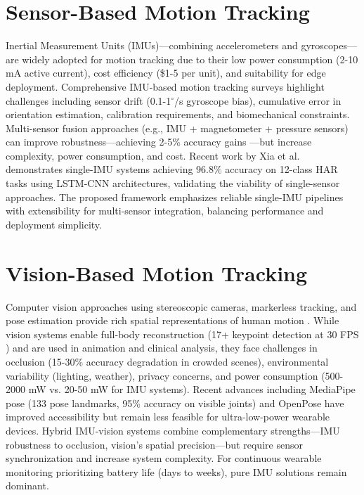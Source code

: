 \section{Sensor-Based Motion Tracking}
Inertial Measurement Units (IMUs)---combining accelerometers and gyroscopes---are widely adopted for motion tracking due to their low power consumption (2-10 mA active current), cost efficiency (\$1-5 per unit), and suitability for edge deployment. Comprehensive IMU-based motion tracking surveys \cite{filippeschi2017survey_imu} highlight challenges including sensor drift (0.1-1$^\circ$/s gyroscope bias), cumulative error in orientation estimation, calibration requirements, and biomechanical constraints. Multi-sensor fusion approaches (e.g., IMU + magnetometer + pressure sensors) can improve robustness---achieving 2-5\% accuracy gains \cite{filippeschi2017survey_imu}---but increase complexity, power consumption, and cost. Recent work by Xia et al. \cite{xia2020lstm_har} demonstrates single-IMU systems achieving 96.8\% accuracy on 12-class HAR tasks using LSTM-CNN architectures, validating the viability of single-sensor approaches. The proposed framework emphasizes reliable single-IMU pipelines with extensibility for multi-sensor integration, balancing performance and deployment simplicity.

\section{Vision-Based Motion Tracking}
Computer vision approaches using stereoscopic cameras, markerless tracking, and pose estimation provide rich spatial representations of human motion \cite{article:motion_tracking_using_vision}. While vision systems enable full-body reconstruction (17+ keypoint detection at 30 FPS \cite{web:Google_Mediapipe}) and are used in animation and clinical analysis, they face challenges in occlusion (15-30\% accuracy degradation in crowded scenes), environmental variability (lighting, weather), privacy concerns, and power consumption (500-2000 mW vs. 20-50 mW for IMU systems). Recent advances including MediaPipe pose \cite{web:Google_Mediapipe} (133 pose landmarks, 95\% accuracy on visible joints) and OpenPose have improved accessibility but remain less feasible for ultra-low-power wearable devices. Hybrid IMU-vision systems \cite{wan2021deep_har_review} combine complementary strengths---IMU robustness to occlusion, vision's spatial precision---but require sensor synchronization and increase system complexity. For continuous wearable monitoring prioritizing battery life (days to weeks), pure IMU solutions remain dominant.


